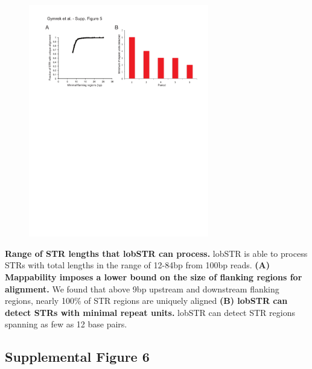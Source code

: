 \begin{figure}[h!]
\centering
\label{fig:lobsup5}
\includegraphics[width=0.7\textwidth]{Figures/Chapter2/SuppFig5.pdf}
\end{figure}
\textbf{Range of STR lengths that lobSTR can process.} lobSTR is able to process STRs with total lengths in the range of 12-84bp from 100bp reads. \textbf{(A) Mappability imposes a lower bound on the size of flanking regions for alignment.} We found that above 9bp upstream and downstream flanking regions, nearly 100\% of STR regions are uniquely aligned \textbf{(B) lobSTR can detect STRs with minimal repeat units.} lobSTR can detect STR regions spanning as few as 12 base pairs. 

\pagebreak
\subsection{Supplemental Figure 6}


